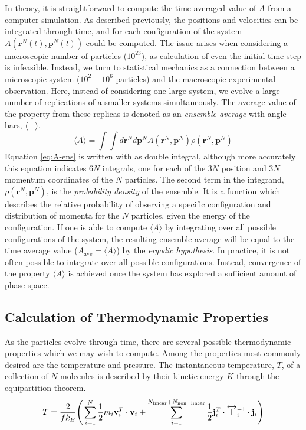 In theory, it is straightforward to compute the time averaged value of
$A$ from a computer simulation. As described previously, the positions
and velocities can be integrated through time, and for each
configuration of the system $A(\mathbf{r}^N(t),\mathbf{p}^N(t))$ could
be computed. The issue arises when considering a macroscopic number of
particles ($10^{23}$), as calculation of even the initial time step is
infeasible. Instead, we turn to statistical mechanics as a connection
between a microscopic system ($10^2 - 10^6$ particles) and the
macroscopic experimental observation. Here, instead of considering one
large system, we evolve a large number of replications of a smaller
systems simultaneously. The average value of the property from these
replicas is denoted as an \textit{ensemble average} with angle bars,
$\langle$~ $\rangle$.
\begin{equation}\label{eq:A-ens}
\langle A \rangle = \int \int d\mathbf{r}^N d\mathbf{p}^N
A(\mathbf{r}^N,\mathbf{p}^N) \rho
(\mathbf{r}^N,\mathbf{p}^N)
\end{equation}
Equation \eqref{eq:A-ens} is written with as double integral, although
more accurately this equation indicates $6N$ integrals, one for each
of the $3N$ position and $3N$ momentum coordinates of the $N$
particles. The second term in the integrand,
$ \rho(\mathbf{r}^N,\mathbf{p}^N)$, is the \textit{probability
  density} of the ensemble. It is a function which describes the
relative probability of observing a specific configuration and
distribution of momenta for the $N$ particles, given the energy of the
configuration. If one is able to compute $\langle A \rangle$ by
integrating over all possible configurations of the system, the
resulting ensemble average will be equal to the time average value
($A_{\mathrm{ave}} = \langle A \rangle$) by the \textit{ergodic
  hypothesis}. In practice, it is not often possible to integrate over
all possible configurations. Instead, convergence of the property
$\langle A \rangle$ is achieved once the system has explored a
sufficient amount of phase space.

\subsection{Calculation of Thermodynamic Properties}
As the particles evolve through time, there are several possible
thermodynamic properties which we may wish to compute. Among the
properties most commonly desired are the temperature and pressure.
The instantaneous temperature, $T$, of a collection of $N$ molecules
is described by their kinetic energy $K$ through the equipartition
theorem.
\begin{equation}\label{Temperature}
T = \frac{2}{fk_B}\Bigg( \sum_{i=1}^{N} \frac{1}{2} m_i {\bf v}_i^T \cdot {\bf v}_i +
\sum_{i=1}^{N_{\mathrm{linear}}+N_{\mathrm{non-linear}}}  \frac{1}{2} {\bf j}_i^T \cdot
\overleftrightarrow{\mathsf{I}}_i^{-1} \cdot {\bf j}_i  \Bigg)
\end{equation}

